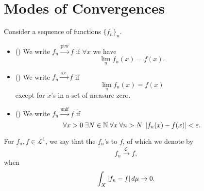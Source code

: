 \documentclass[notoc,notitlepage]{tufte-book}
\newcommand{\convptw}{\overset{\text{ptw}}{\to}}
\newcommand{\convae}{\overset{\text{a.e.}}{\to}}
\newcommand{\convunif}{\overset{\text{unif}}{\to}}
\newcommand{\convlone}{\overset{\mathcal{L}^1}{\to}}
\begin{document}
\section{Modes of Convergences}%
\label{sec:modes_of_convergences}

\begin{notation}
  Consider a sequence of functions $\{ f_n \}_n$.
  \begin{itemize}
    \item ()
      We write $f_n \convptw f$ if
      $\forall x$ we have
      \begin{equation*}
        \lim_{n} f_n(x) = f(x).
      \end{equation*}
    \item ()
      We write $f_n \convae f$ if
      \begin{equation*}
        \lim_{n} f_n(x) = f(x)
      \end{equation*}
      except for $x$'s in a set of measure zero.
    \item ()
      We write $f_n \convunif f$ if
      \begin{equation*}
        \forall x > 0 \; \exists N \in \mathbb{N} \;
        \forall x \; \forall n > N \;
        \left|f_n(x) - f(x)\right| < \varepsilon.
      \end{equation*}
  \end{itemize}
\end{notation}

\begin{defn}\label{defn:_mathcal_l_1_convergence}
  For $f_n, f \in \mathcal{L}^1$, we say that the $f_n$'s
   to $f$,
  of which we denote by
  \begin{equation*}
    f_n \convlone f,
  \end{equation*}
  when
  \begin{equation*}
    \int_{X} \left|f_n - f\right| \mathop{}\!d{\mu} \to 0.
  \end{equation*}
\end{defn}
\end{document}
